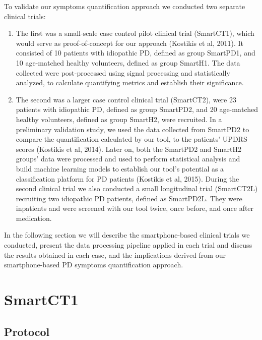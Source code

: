 \noindent
To validate our symptoms quantification approach we conducted two separate clinical trials: 

\begin{enumerate}
\item The first was a small-scale case control pilot clinical trial (\gls{SmartCT1}), which would serve as proof-of-concept for our approach (Kostikis et al, 2011). It consisted of 10 patients with idiopathic \gls{PD}, defined as group \gls{SmartPD1}, and 10 age-matched healthy volunteers, defined as group \gls{SmartH1}. The data collected were post-processed using signal processing and statistically analyzed, to calculate quantifying metrics and establish their significance. 
\item The second was a larger case control clinical trial (\gls{SmartCT2}), were 23 patients with idiopathic \gls{PD}, defined as group \gls{SmartPD2}, and 20 age-matched healthy volunteers, defined as group \gls{SmartH2}, were recruited. In a preliminary validation study, we used the data collected from \gls{SmartPD2} to compare the quantification calculated by our tool, to the patients' \gls{UPDRS} scores (Kostikis et al, 2014). Later on, both the \gls{SmartPD2} and \gls{SmartH2} groups' data were processed and used to perform statistical analysis and build machine learning models to establish our tool's potential as a classification platform for \gls{PD} patients (Kostikis et al, 2015). During the second clinical trial we also conducted a small longitudinal trial (\gls{SmartCT2L}) recruiting two idiopathic \gls{PD} patients, defined as \gls{SmartPD2L}. They were inpatients and were screened with our tool twice, once before, and once after medication. 
\end{enumerate}

In the following section we will describe the smartphone-based clinical trials we conducted, present the data processing pipeline applied in each trial and discuss the results obtained in each case, and the implications derived from our smartphone-based \gls{PD} symptoms quantification approach. 

\section{SmartCT1}
\label{sec:SmartCT1}

\subsection{Protocol}
\label{subsec:SmartCT1Protocol}

